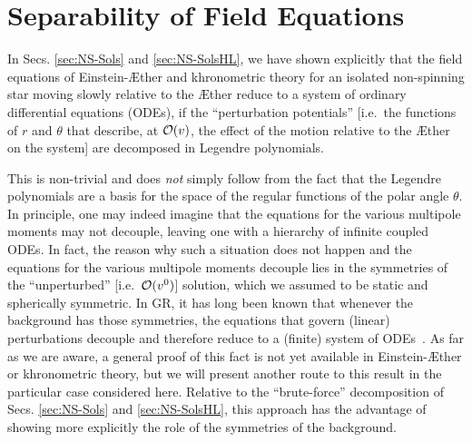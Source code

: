\documentclass[prd,aps,twocolumn,nofootinbib,showpacs,superscriptaddress]{revtex4-1}
\begin{document}
\appendix


\section{Separability of Field Equations}
\label{app:separability}

In Secs. \ref{sec:NS-Sols} and \ref{sec:NS-SolsHL}, we have shown explicitly that the field
equations of Einstein-\AE ther and khronometric theory for an isolated non-spinning star moving slowly relative to the \AE ther reduce to a system
of ordinary differential equations (ODEs), if the ``perturbation
potentials'' [i.e.~the functions of $r$ and $\theta$ that describe, at ${\cal
  O}(v)$, the effect of the motion relative to the \AE ther on the system] 
are decomposed in Legendre polynomials.

This is non-trivial and does \textit{not} simply follow from the
fact that the Legendre polynomials are a basis  for the space of the
regular functions of the polar angle $\theta$. In principle, one may
indeed imagine that the equations for the various multipole moments
may not decouple, leaving one with a hierarchy of infinite coupled
ODEs.  In fact, the reason why such a situation does not happen and
the equations for the various multipole moments decouple lies in the
symmetries of the ``unperturbed'' [i.e.~${\cal O}(v^0)$] solution,
which we assumed to be static and spherically symmetric.  In GR, 
it has long been known that whenever the background has
those symmetries, the equations that govern (linear) perturbations 
decouple and therefore reduce to a (finite) system of
ODEs~\cite{Regge:1957rw,Zerilli:1970fj}.  As far as we are aware, a
general proof of this fact is not yet available in Einstein-\AE ther or khronometric theory, 
but we will present another route to this result in the
particular case considered here.  Relative to the
``brute-force'' decomposition of Secs. \ref{sec:NS-Sols} and \ref{sec:NS-SolsHL}, this approach has
the advantage  of showing more explicitly the role of the symmetries
of the background.
\end{document}
